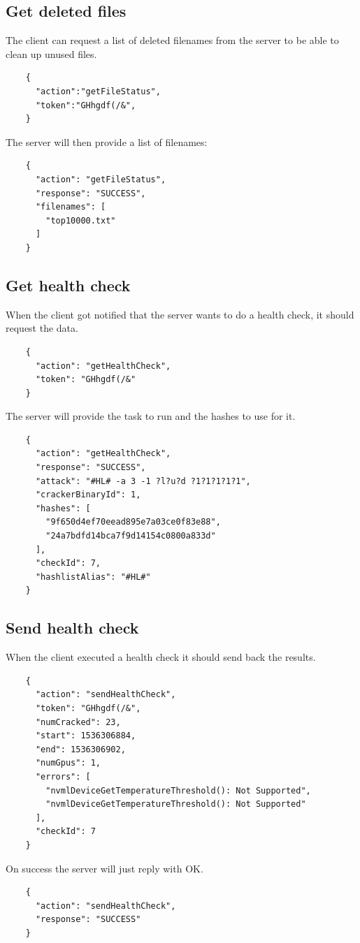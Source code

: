 \documentclass{article}
\begin{document}
	\subsection*{Get deleted files}
	The client can request a list of deleted filenames from the server to be able to clean up unused files.
	\begin{verbatim}
	{
	  "action":"getFileStatus",
	  "token":"GHhgdf(/&",
	}
	\end{verbatim}
	The server will then provide a list of filenames:
	\begin{verbatim}
	{
	  "action": "getFileStatus",
	  "response": "SUCCESS",
	  "filenames": [
	    "top10000.txt"
	  ]
	}
	\end{verbatim}
	
	\subsection*{Get health check}
	When the client got notified that the server wants to do a health check, it should request the data.
	\begin{verbatim}
	{
	  "action": "getHealthCheck", 
	  "token": "GHhgdf(/&"
	}
	\end{verbatim}
	The server will provide the task to run and the hashes to use for it.
	\begin{verbatim}
	{
	  "action": "getHealthCheck",
	  "response": "SUCCESS",
	  "attack": "#HL# -a 3 -1 ?l?u?d ?1?1?1?1?1",
	  "crackerBinaryId": 1,
	  "hashes": [
	    "9f650d4ef70eead895e7a03ce0f83e88",
	    "24a7bdfd14bca7f9d14154c0800a833d"
	  ],
	  "checkId": 7,
	  "hashlistAlias": "#HL#"
	}
	\end{verbatim}
	
	\subsection*{Send health check}
	When the client executed a health check it should send back the results.
	\begin{verbatim}
	{
	  "action": "sendHealthCheck", 
	  "token": "GHhgdf(/&", 
	  "numCracked": 23, 
	  "start": 1536306884, 
	  "end": 1536306902, 
	  "numGpus": 1, 
	  "errors": [
	    "nvmlDeviceGetTemperatureThreshold(): Not Supported", 
	    "nvmlDeviceGetTemperatureThreshold(): Not Supported"
	  ], 
	  "checkId": 7
	}
	\end{verbatim}
	On success the server will just reply with OK.
	\begin{verbatim}
	{
	  "action": "sendHealthCheck",
	  "response": "SUCCESS"
	}
	\end{verbatim}
	
\end{document}
